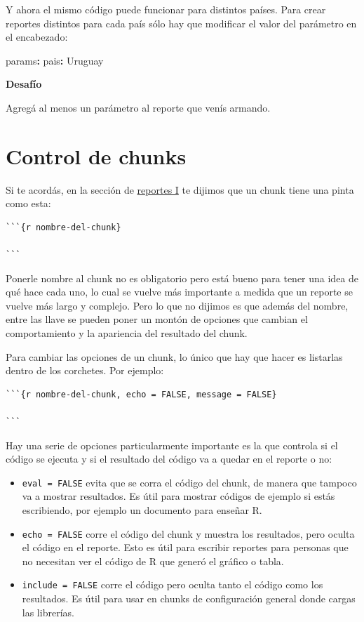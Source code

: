 \documentclass[
  openany]{book}
\newenvironment{Shaded}{\begin{snugshade}}{\end{snugshade}}
\newcommand{\AttributeTok}[1]{\textcolor[rgb]{0.77,0.63,0.00}{#1}}
\newcommand{\FunctionTok}[1]{\textcolor[rgb]{0.00,0.00,0.00}{#1}}
\newcommand{\KeywordTok}[1]{\textcolor[rgb]{0.13,0.29,0.53}{\textbf{#1}}}
\begin{document}
Y ahora el mismo código puede funcionar para distintos países. Para crear reportes distintos para cada país sólo hay que modificar el valor del parámetro en el encabezado:

\begin{Shaded}
\begin{Highlighting}[]
\FunctionTok{params}\KeywordTok{:}
\AttributeTok{  }\FunctionTok{pais}\KeywordTok{:}\AttributeTok{ Uruguay}
\end{Highlighting}
\end{Shaded}

\textbf{Desafío}

Agregá al menos un parámetro al reporte que venís armando.

\hypertarget{control-de-chunks}{%
\section{Control de chunks}\label{control-de-chunks}}

Si te acordás, en la sección de \href{10-reportes-I.html}{reportes I} te dijimos que un chunk tiene una pinta como esta:

\begin{verbatim}
```{r nombre-del-chunk}

```
\end{verbatim}

Ponerle nombre al chunk no es obligatorio pero está bueno para tener una idea de qué hace cada uno, lo cual se vuelve más importante a medida que un reporte se vuelve más largo y complejo. Pero lo que no dijimos es que además del nombre, entre las llave se pueden poner un montón de opciones que cambian el comportamiento y la apariencia del resultado del chunk.

Para cambiar las opciones de un chunk, lo único que hay que hacer es listarlas dentro de los corchetes. Por ejemplo:

\begin{verbatim}
```{r nombre-del-chunk, echo = FALSE, message = FALSE}

```
\end{verbatim}

Hay una serie de opciones particularmente importante es la que controla si el código se ejecuta y si el resultado del código va a quedar en el reporte o no:

\begin{itemize}
\item
  \texttt{eval\ =\ FALSE} evita que se corra el código del chunk, de manera que tampoco va a mostrar resultados. Es útil para mostrar códigos de ejemplo si estás escribiendo, por ejemplo un documento para enseñar R.
\item
  \texttt{echo\ =\ FALSE} corre el código del chunk y muestra los resultados, pero oculta el código en el reporte. Esto es útil para escribir reportes para personas que no necesitan ver el código de R que generó el gráfico o tabla.
\item
  \texttt{include\ =\ FALSE} corre el código pero oculta tanto el código como los resultados. Es útil para usar en chunks de configuración general donde cargas las librerías.
\end{itemize}
\end{document}
